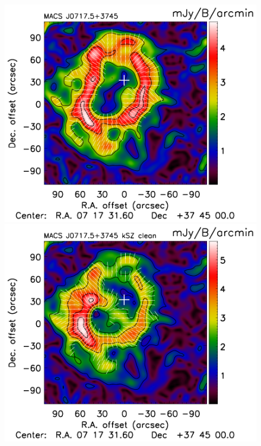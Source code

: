\documentclass[twocolumn,traditabstract]{aa}
\begin{document}
\begin{figure}[h]
\centering
\includegraphics[trim=0cm 0cm 0cm 0cm, clip=true, totalheight=3.8cm]{Figure/Grad_MACSJ0717_15_15_45.pdf}
\includegraphics[trim=0cm 0cm 0cm 0cm, clip=true, totalheight=3.8cm]{Figure/Grad_MACSJ0717kSZ_15_15_45.pdf}

\end{figure}
\end{document}
